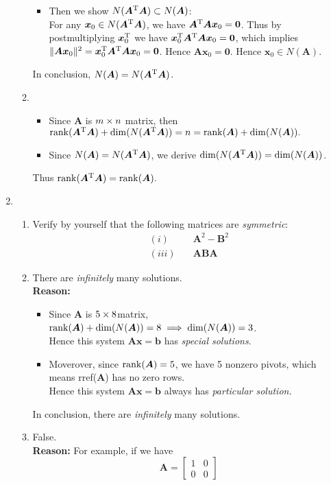 \begin{enumerate}
\begin{enumerate}
\begin{itemize}
\item
Then we show $N(\bm A^{\mathrm T}\bm A)\subset N(\bm A)$:\\
For any $\bm x_0\in N(\bm A^{\mathrm T}\bm A)$, we have $\bm A^{\mathrm T}\bm A\bm x_0=\bm 0$. Thus by postmultiplying $\bm x_0^{\mathrm T}$ we have $\bm x_0^{\mathrm T}\bm A^{\mathrm T}\bm A\bm x_0=\bm 0$, which implies $\lVert \bm A\bm x_0\rVert^2=\bm x_0^{\mathrm T}\bm A^{\mathrm T}\bm A\bm x_0=\bm 0$. Hence $\bm A\bm x_0=\bm 0$. Hence $\bm x_0\in N(\bm A)$.
\end{itemize}
In conclusion, $N(\bm A)=N(\bm A^{\mathrm T}\bm A)$.
\item
\begin{itemize}
\item
Since $\bm A$ is $m\times n$ matrix, then $\operatorname{rank}(\bm A^{\mathrm T}\bm A)+\dim(N(\bm A^{\mathrm T}\bm A))=n=\operatorname{rank}(\bm A)+\dim(N(\bm A)).$
\item
Since $N(\bm A)=N(\bm A^{\mathrm T}\bm A)$, we derive $\dim(N(\bm A^{\mathrm T}\bm A))=\dim(N(\bm A))$.
\end{itemize}
Thus $\operatorname{rank}(\bm A^{\mathrm T}\bm A)=\operatorname{rank}(\bm A).$
\end{enumerate}
\item
\begin{enumerate}
\item
Verify by yourself that the following matrices are \textit{symmetric}:
\begin{align*}
(i)\quad&\bm A^2-\bm B^2\\
(iii)\quad&\bm{ABA}
\end{align*}
\item
There are \textit{infinitely} many solutions.\\
\textbf{Reason: }
\begin{itemize}
\item
Since $\bm A$ is $5\times 8$matrix, $\operatorname{rank}(\bm A)+\dim(N(\bm A))=8\implies \dim(N(\bm A))=3$.\\
Hence this system $\bm{Ax}=\bm b$ has \emph{special solutions}.
\item
Moverover, since $\operatorname{rank}(\bm A)=5$, we have 5 nonzero pivots, which means rref($\bm A$) has no zero rows.\\
Hence this system $\bm{Ax}=\bm b$ always has \emph{particular solution.}
\end{itemize}
In conclusion, there are \textit{infinitely} many solutions.
\item
False.\\
\textbf{Reason: }For example, if we have
\[
\bm A=\begin{bmatrix}
1&0\\0&0

\end{bmatrix}\]
\end{enumerate}
\end{enumerate}
